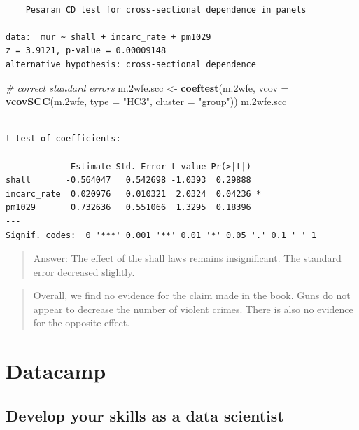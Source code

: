 \documentclass[]{article}
\newenvironment{Shaded}{\begin{snugshade}}{\end{snugshade}}
\newcommand{\KeywordTok}[1]{\textcolor[rgb]{0.13,0.29,0.53}{\textbf{#1}}}
\newcommand{\DataTypeTok}[1]{\textcolor[rgb]{0.13,0.29,0.53}{#1}}
\newcommand{\StringTok}[1]{\textcolor[rgb]{0.31,0.60,0.02}{#1}}
\newcommand{\CommentTok}[1]{\textcolor[rgb]{0.56,0.35,0.01}{\textit{#1}}}
\newcommand{\NormalTok}[1]{#1}
\theoremstyle{definition}
\theoremstyle{definition}
\theoremstyle{definition}
\theoremstyle{remark}
\begin{document}
\begin{verbatim}

    Pesaran CD test for cross-sectional dependence in panels

data:  mur ~ shall + incarc_rate + pm1029
z = 3.9121, p-value = 0.00009148
alternative hypothesis: cross-sectional dependence
\end{verbatim}

\begin{Shaded}
\begin{Highlighting}[]
\CommentTok{# correct standard errors}
\NormalTok{m.2wfe.scc <-}\StringTok{ }\KeywordTok{coeftest}\NormalTok{(m.2wfe, }\DataTypeTok{vcov =} \KeywordTok{vcovSCC}\NormalTok{(m.2wfe, }\DataTypeTok{type =} \StringTok{"HC3"}\NormalTok{, }\DataTypeTok{cluster =} \StringTok{"group"}\NormalTok{))}
\NormalTok{m.2wfe.scc}
\end{Highlighting}
\end{Shaded}

\begin{verbatim}

t test of coefficients:

             Estimate Std. Error t value Pr(>|t|)  
shall       -0.564047   0.542698 -1.0393  0.29888  
incarc_rate  0.020976   0.010321  2.0324  0.04236 *
pm1029       0.732636   0.551066  1.3295  0.18396  
---
Signif. codes:  0 '***' 0.001 '**' 0.01 '*' 0.05 '.' 0.1 ' ' 1
\end{verbatim}

\begin{quote}
Answer: The effect of the shall laws remains insignificant. The standard
error decreased slightly.
\end{quote}

\begin{quote}
Overall, we find no evidence for the claim made in the book. Guns do not
appear to decrease the number of violent crimes. There is also no
evidence for the opposite effect.
\end{quote}

\section{Datacamp}\label{datacamp}

\subsection{Develop your skills as a data
scientist}\label{develop-your-skills-as-a-data-scientist}
\end{document}
